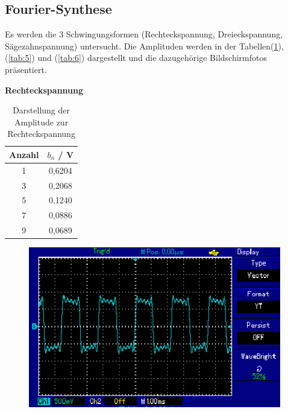 \subsection{Fourier-Synthese}
Es werden die 3 Schwingungsformen (Rechteckspannung, Dreieckspannung, Sägezahnspannung) untersucht.
Die Amplituden werden in der Tabellen(\ref{tab:4}),(\ref{tab:5}) und (\ref{tab:6}) dargestellt und die dazugehörige Bildschirmfotos präsentiert.\\

\centerline{\textbf{Rechteckspannung}}
\begin{table}[H]
  \centering
  \begin{tabular}{c c}
    \toprule
    Anzahl & $b_n$ / V \\
    \midrule
    1 & 0,6204 \\
    3 & 0,2068 \\
    5 & 0,1240 \\
    7 & 0,0886 \\
    9 & 0,0689 \\
    \bottomrule
  \end{tabular}
  \caption{Darstellung der Amplitude zur Rechteckspannung}
  \label{tab:4}
\end{table}
\begin{figure}[H]
  \centering
	\includegraphics[width=10 cm, height = 7cm]{Rechteckspannung/3.png}
\end{figure}

